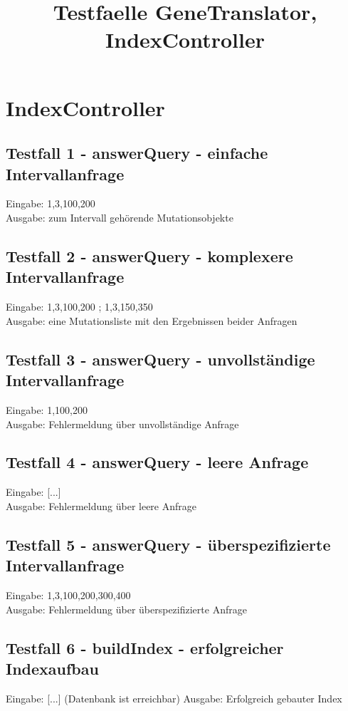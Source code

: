 \documentclass[]{article}
\title{Testfaelle GeneTranslator, IndexController}
\author{}
\begin{document}
\maketitle

\section{IndexController}
\subsection{Testfall 1 - answerQuery - einfache Intervallanfrage}
Eingabe: 1,3,100,200\\
Ausgabe: zum Intervall gehörende Mutationsobjekte 

\subsection{Testfall 2 - answerQuery - komplexere Intervallanfrage}
Eingabe: 1,3,100,200 ; 1,3,150,350\\
Ausgabe: eine Mutationsliste mit den Ergebnissen beider Anfragen

\subsection{Testfall 3 - answerQuery - unvollständige Intervallanfrage}
Eingabe: 1,100,200\\
Ausgabe: Fehlermeldung über unvollständige Anfrage

\subsection{Testfall 4 - answerQuery - leere Anfrage}
Eingabe: [...]\\
Ausgabe: Fehlermeldung über leere Anfrage

\subsection{Testfall 5 - answerQuery - überspezifizierte Intervallanfrage}
Eingabe: 1,3,100,200,300,400\\
Ausgabe: Fehlermeldung über überspezifizierte Anfrage

\subsection{Testfall 6 - buildIndex - erfolgreicher Indexaufbau}
Eingabe: [...] (Datenbank ist erreichbar)
Ausgabe: Erfolgreich gebauter Index
\end{document}
